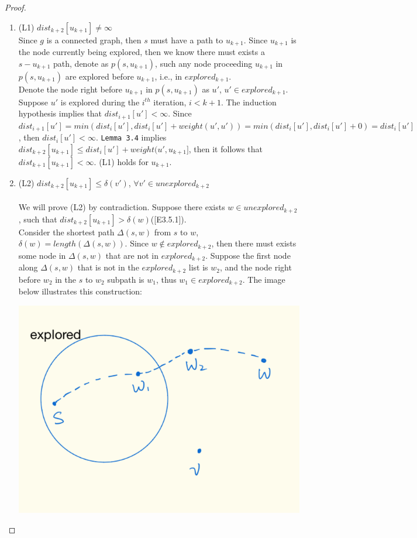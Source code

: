 \documentclass[11pt, oneside]{article}   	%
\theoremstyle{definition}
\begin{document}
\begin{proof}
\begin{itemize}
  \begin{enumerate}
  \item (L1) $dist_{k+2}[u_{k+1}] \neq \infty$
  \\
  Since $g$ is a connected graph, then $s$ must have a path to $u_{k+1}$. Since $u_{k+1}$ is the node currently being explored, then we know there must exists a $s-u_{k+1}$ path, denote as $p(s, u_{k+1})$, such any node proceeding $u_{k+1}$ in $p(s, u_{k+1})$ are explored before $u_{k+1}$, i.e., in $explored_{k+1}$. 
  \\
  Denote the node right before $u_{k+1}$ in $p(s, u_{k+1})$ as $u'$, $u' \in explored_{k+1}$. Suppose $u'$ is explored during the $i^{th}$ iteration, $i < k+1$. The induction hypothesis implies that $dist_{i+1}[u'] < \infty$. Since $dist_{i+1}[u'] = min(dist_i[u'], dist_i[u'] + weight(u', u')) = min(dist_i[u'], dist_i[u'] + 0) = dist_i[u']$, then $ dist_i[u'] < \infty$. \texttt{Lemma 3.4} implies $dist_{k+2}[u_{k+1}] \leq dist_i[u'] + weight(u', u_{k+1}]$, then it follows that $dist_{k+1}[u_{k+1}] < \infty$. (L1) holds for $u_{k+1}$. 
  \\
  \item (L2) $dist_{k+2}[u_{k+1}] \leq \delta(v')$, $\forall v' \in unexplored_{k+2}$
  \\\\
  We will prove (L2) by contradiction. Suppose there exists $w \in unexplored_{k+2}$, such that $dist_{k+2}[u_{k+1}] > \delta(w)$([E3.5.1]). 
  \\
  Consider the shortest path $\Delta(s, w)$ from $s$ to $w$, $\delta(w) = length(\Delta(s, w))$. Since $w \notin explored_{k+2}$, then there must exists some node in $\Delta(s, w)$ that are not in $explored_{k+2}$. Suppose the first node along $\Delta(s, w)$ that is not in the $explored_{k+2}$ list is $w_2$, and the node right before $w_2$ in the $s$ to $w_2$ subpath is $w_1$, thus $w_1 \in explored_{k+2}$. The image below illustrates this construction: 
  \\
  \begin{center}
  \includegraphics[scale = 0.35]{p1.png}

\end{center}
\end{enumerate}
\end{itemize}
\end{proof}
\end{document}
